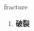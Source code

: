 
\begin{frame}
{\huge fracture}
\begin{center}
\begin{enumerate}\Large
  \item \textbf{破裂}
\end{enumerate}
\end{center}
\end{frame}
